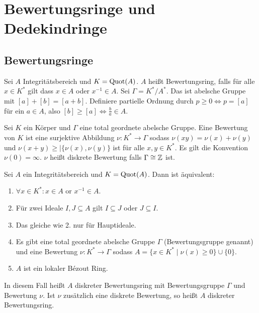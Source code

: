 \chapter{Bewertungsringe und Dedekindringe}
\section{Bewertungsringe}
\begin{Def} Sei \(A\) Integritätsbereich und \(K=\operatorname{Quot}(A)\).
	\(A\) heißt Bewertungsring, falls für alle \(x\in K^*\) gilt dass \(x\in A\) oder \(x^{-1}\in A\).
	Sei \(\Gamma=K^*/A^*\).  Das ist abelsche Gruppe mit \([a]+[b]=[a+b]\). Definiere partielle Ordnung durch 
	\(p\geq 0 \iff p=[a]\) für ein \(a\in A\), also \([b]\geq [a] \iff \frac b a \in A\).
	
\end{Def}
\begin{Def} Sei \(K\) ein Körper und \(\Gamma\) eine total geordnete abelsche Gruppe. Eine Bewertung von \(K\) ist eine 
	surjektive Abbildung \(\nu\colon K^*\to \Gamma\) sodass \(\nu(xy)=\nu(x)+\nu(y)\) und \(\nu(x+y)\geq \mid\{\nu(x),\nu(y)\}\) ist für alle
	\(x,y\in K^*\).
	Es gilt die Konvention  \(\nu(0)=\infty\).
	\(\nu\) heißt diskrete Bewertung falls \(\Gamma\cong\mathbb{Z}\) ist.
\end{Def}
\begin{Satz} Sei \(A\) ein Integritätsbereich und \(K=\operatorname{Quot}(A)\).
	Dann ist äquivalent:
	\begin{enumerate}
		\item \(\forall x\in K^*\colon x\in A \text{ or } x^{-1}\in A\).
		\item Für zwei Ideale \(I,J\subseteq A\) gilt \(I\subseteq J\) oder \(J\subseteq I\).
		\item Das gleiche wie 2. nur für Hauptideale.
		\item Es gibt eine total geordnete abelsche Gruppe \(\Gamma\) (Bewertungsgruppe genannt)
		und eine Bewertung \(\nu\colon K^*\to \Gamma\) sodass \(A=\{x\in K^*\mid \nu(x)\geq 0\}\cup\{0\}\).
		\item \(A\) ist ein lokaler Bézout Ring.
	\end{enumerate}
	In diesem Fall heißt \(A\) diskreter Bewertungsring mit Bewertungsgruppe \(\Gamma\) und Bewertung \(\nu\).
	Ist \(\nu\) zusätzlich eine diskrete Bewertung, so heißt \(A\) diskreter Bewertungsring.
\end{Satz}
